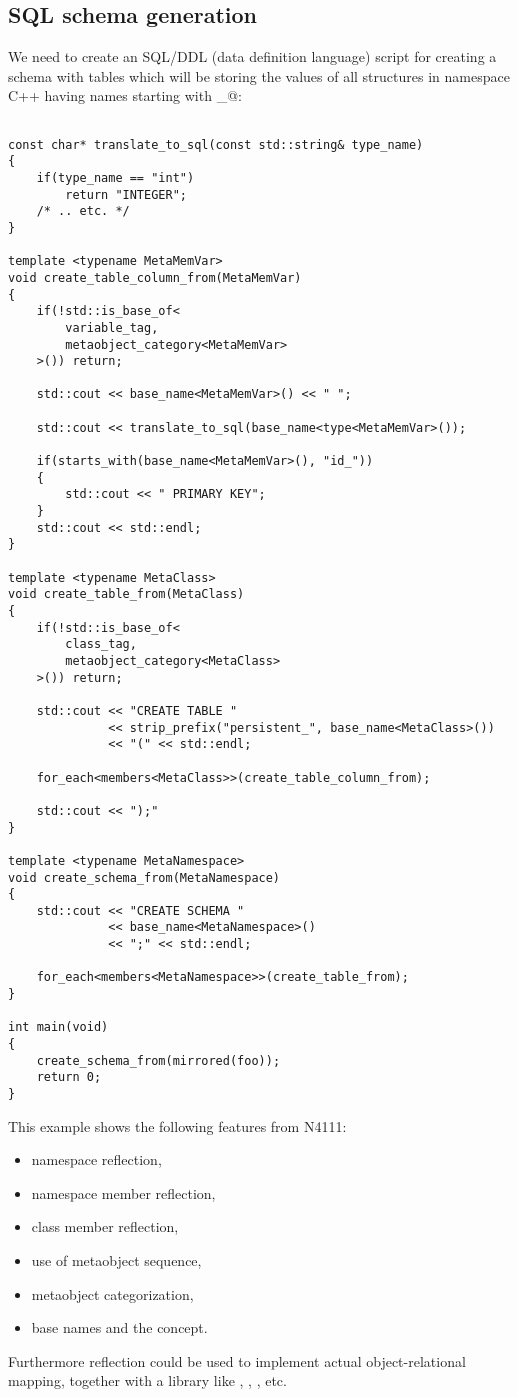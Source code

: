\subsection{SQL schema generation}

We need to create an SQL/DDL (data definition language) script for creating a schema
with tables which will be storing the values of all structures in namespace C++ \verb@foo@
having names starting with \verb@persistent_@:

\begin{verbatim}

const char* translate_to_sql(const std::string& type_name)
{
	if(type_name == "int")
		return "INTEGER";
	/* .. etc. */
}

template <typename MetaMemVar>
void create_table_column_from(MetaMemVar)
{
	if(!std::is_base_of<
		variable_tag,
		metaobject_category<MetaMemVar>
	>()) return;

	std::cout << base_name<MetaMemVar>() << " ";

	std::cout << translate_to_sql(base_name<type<MetaMemVar>());

	if(starts_with(base_name<MetaMemVar>(), "id_"))
	{
		std::cout << " PRIMARY KEY";
	}
	std::cout << std::endl;
}

template <typename MetaClass>
void create_table_from(MetaClass)
{
	if(!std::is_base_of<
		class_tag,
		metaobject_category<MetaClass>
	>()) return;

	std::cout << "CREATE TABLE "
	          << strip_prefix("persistent_", base_name<MetaClass>())
	          << "(" << std::endl;

	for_each<members<MetaClass>>(create_table_column_from);

	std::cout << ");"
}

template <typename MetaNamespace>
void create_schema_from(MetaNamespace)
{
	std::cout << "CREATE SCHEMA "
	          << base_name<MetaNamespace>()
	          << ";" << std::endl;

	for_each<members<MetaNamespace>>(create_table_from);
}

int main(void)
{
	create_schema_from(mirrored(foo));
	return 0;
}

\end{verbatim}

This example shows the following features from N4111:

\begin{itemize}
\item{namespace reflection,}
\item{namespace member reflection,}
\item{class member reflection,}
\item{use of metaobject sequence,}
\item{metaobject categorization,}
\item{base names and the  concept.}
\end{itemize}

Furthermore reflection could be used to implement actual object-relational mapping,
together with a library like \verb@SOCI@, \verb@ODBC@, \verb@libpq@, etc.
